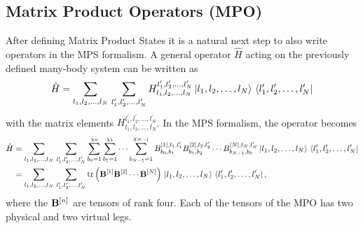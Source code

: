 \subsection*{Matrix Product Operators (MPO)}
After defining Matrix Product States it is a natural next step to also write operators in the MPS formalism. A general operator
$\hat{H}$ acting on the previously defined many-body system can be written as
\begin{equation*}
    \hat{H} = \sum_{l_1,l_2,\dots,l_N}\,\sum_{l_1^\prime,l_2^\prime,\dots,l_N^\prime}
    H_{l_1,l_2,\dots,l_N}^{l_1^\prime,l_2^\prime,\dots,l_N^\prime}
    \ket*{l_1, l_2, \dots, l_N} \bra*{l_1^\prime, l_2^\prime, \dots, l_N^\prime}
\end{equation*}
with the matrix elements $ H_{l_1,l_2,\dots,l_N}^{l_1^\prime,l_2^\prime,\dots,l_N^\prime}$. In the MPS formalism,
the operator becomes
\begin{equation*}
    \begin{split}
        \hat{H} &= \sum_{l_1,l_2,\dots,l_N}\,\sum_{l_1^\prime,l_2^\prime,\dots,l_N^\prime} \sum_{b_0 = 1}^{\chi_0} \sum_{b_1 = 1}^{\chi_1} \cdots \sum_{b_{N-1} = 1}^{\chi_{N-1}} B_{b_0, b_1}^{[1], l_1, l_1^\prime} B_{b_1, b_2}^{[2], l_2, l_2^\prime}\cdots B_{b_{N-1}, b_0}^{[N], l_N, l_N^\prime} 
        \ket*{l_1, l_2, \dots, l_N} \bra*{l_1^\prime, l_2^\prime, \dots, l_N^\prime} \\
                &= \sum_{l_1,l_2,\dots,l_N}\,\sum_{l_1^\prime,l_2^\prime,\dots,l_N^\prime} \trace\left(
                    \vectorbold{B}^{[1]} \vectorbold{B}^{[2]} \cdots \vectorbold{B}^{[N]}
                \right) \ket*{l_1, l_2, \dots, l_N} \bra*{l_1^\prime, l_2^\prime, \dots, l_N^\prime},
    \end{split}
\end{equation*}
where the $\vectorbold{B}^{[n]}$ are tensors of rank four. Each of the tensors of the MPO has two physical and two virtual legs.


